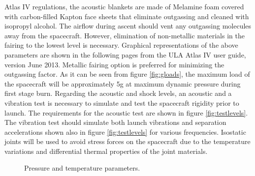 Atlas IV regulations, the acoustic blankets are made of Melamine foam covered with carbon-filled Kapton face sheets that eliminate outgassing and cleaned with isopropyl alcohol. The airflow during ascent should vent any outgassing molecules away from the spacecraft. However, elimination of non-metallic materials in the fairing to the lowest level is necessary. Graphical representations of the above parameters are shown in the following pages from the ULA Atlas IV user guide, version June 2013. Metallic fairing option is preferred for minimizing the outgassing factor. As it can be seen from figure \ref{fig:gloads}, the maximum load of the spacecraft will be approximately 5g at maximum dynamic pressure during first stage burn. Regarding the acoustic and shock levels, an acoustic and a vibration test is necessary to simulate and test the spacecraft rigidity prior to launch. The requirements for the acoustic test are shown in figure \ref{fig:testlevels}. The vibration test should simulate both launch vibrations and separation accelerations shown also in figure \ref{fig:testlevels} for various frequencies. Isostatic joints will be used to avoid stress forces on the spacecraft due to the temperature variations and differential thermal properties of the joint materials. 
\begin{figure}[htb]
    \centering
    \captionsetup[subfigure]{width=0.45\textwidth}
    \caption{Pressure and temperature parameters.}\label{fig:press_temp}
\end{figure}

